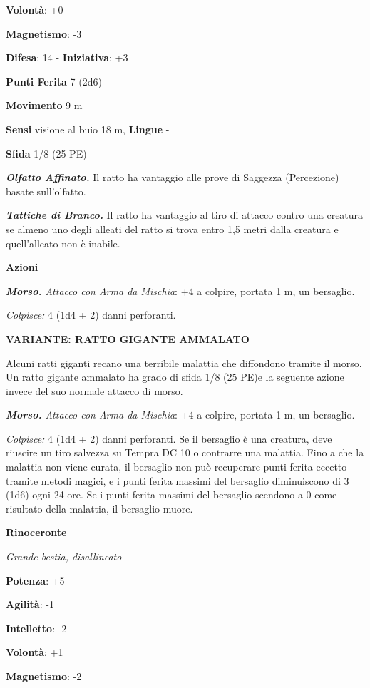 \begin{multicols}{2}
\textbf{Volontà}: +0

\textbf{Magnetismo}: -3

\textbf{Difesa}: 14 - \textbf{Iniziativa}: +3

\textbf{Punti Ferita} 7 (2d6)

\textbf{Movimento} 9 m

\textbf{Sensi} visione al buio 18 m, 
\textbf{Lingue} -

\textbf{Sfida} 1/8 (25 PE)\smallskip

\emph{\textbf{Olfatto Affinato.}} Il ratto ha vantaggio alle prove di
Saggezza (Percezione) basate sull'olfatto.

\emph{\textbf{Tattiche di Branco.}} Il ratto ha vantaggio al tiro di
attacco contro una creatura se almeno uno degli alleati del ratto si
trova entro 1,5 metri dalla creatura e quell'alleato non è inabile.

\smallskip\textbf{Azioni}

\emph{\textbf{Morso.} Attacco con Arma da Mischia}: +4 a colpire,
portata 1 m, un bersaglio.

\emph{Colpisce:} 4 (1d4 + 2) danni perforanti.

\textbf{VARIANTE: RATTO GIGANTE AMMALATO}

Alcuni ratti giganti recano una terribile malattia che diffondono
tramite il morso. Un ratto gigante ammalato ha grado di sfida 1/8 (25
PE)\smallskip e la seguente azione invece del suo normale attacco di morso.

\emph{\textbf{Morso.} Attacco con Arma da Mischia}: +4 a colpire,
portata 1 m, un bersaglio.

\emph{Colpisce:} 4 (1d4 + 2) danni perforanti. Se il bersaglio è una
creatura, deve riuscire un tiro salvezza su Tempra DC 10 o
contrarre una malattia. Fino a che la malattia non viene curata, il
bersaglio non può recuperare punti ferita eccetto tramite metodi magici,
e i punti ferita massimi del bersaglio diminuiscono di 3 (1d6) ogni 24
ore. Se i punti ferita massimi del bersaglio scendono a 0 come risultato
della malattia, il bersaglio muore.

\textbf{Rinoceronte}

\emph{Grande bestia, disallineato}

\textbf{Potenza}: +5

\textbf{Agilità}: -1

\textbf{Intelletto}: -2

\textbf{Volontà}: +1

\textbf{Magnetismo}: -2


\end{multicols}
